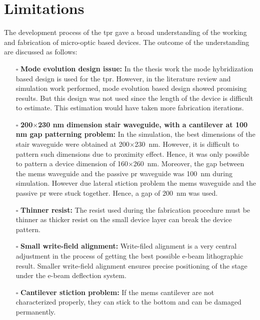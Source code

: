 \documentclass[../report.tex]{subfiles}
\begin{document}
	\section{Limitations}
The development process of the \gls{tpr} gave a broad understanding of the working and fabrication of micro-optic based devices. The outcome of the understanding are discussed as follows:
\begin{itemize}	
	\item[$\square$] \textbf{Mode evolution design issue:} In the thesis work the mode hybridization based design is used for the \gls{tpr}. However, in the literature review and simulation work performed, mode evolution based design showed promising results. But this design was not used since the length of the device is difficult to estimate. This estimation would have taken more fabrication iterations. 
	
	\item[$\square$] \textbf{200$\times$230 nm dimension stair waveguide, with a cantilever at 100 nm gap patterning problem:} In the simulation, the best dimensions of the stair waveguide were obtained at 200$\times$\SI{230}{\nano\meter}. However, it is difficult to pattern such dimensions due to proximity effect. Hence, it was only possible to pattern a device dimension of 160$\times$\SI{260}{\nano\meter}. Moreover, the gap between the \gls{mems} waveguide and the passive \gls{pr} waveguide was \SI{100}{\nano\meter} during simulation. However due lateral stiction problem the \gls{mems} waveguide and the passive \gls{pr} were stuck together. Hence, a gap of \SI{200}{\nano\meter} was used.
	
	\item[$\square$] \textbf{Thinner resist:} The resist used during the fabrication procedure must be thinner as thicker resist on the small device layer can break the device pattern.
	
	\item[$\square$] \textbf{Small write-field alignment:} Write-filed alignment is a very central adjustment in the process of getting the best possible e-beam lithographic result. Smaller write-field alignment ensures precise positioning of the stage under the e-beam deflection system.
	
	\item[$\square$] \textbf{Cantilever stiction problem:} If the \gls{mems} cantilever are not characterized properly, they can stick to the bottom and can be damaged permanently.
	

\end{itemize}
\end{document}
